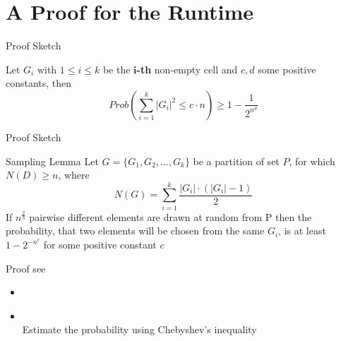 \documentclass[18pt]{beamer}
\begin{document}
\section{A Proof for the Runtime}
\begin{frame}{Proof Sketch}
	\begin{theorem}
		Let $G_i$ with $1\leq i \leq k$ be the \textbf{$\boldsymbol{i}$-th} non-empty cell and $c, d$ some positive constants, then 
	$$Prob\left(\sum_{i=1}^k |G_i|^2 \leq c \cdot n \right) \geq  1 - \frac{1}{2^{n^d}}$$
	\end{theorem}
\end{frame}


\begin{frame}{Proof Sketch}
\begin{block}{Sampling Lemma}
Let $G = \{G_1, G_2,...,G_k\}$ be a partition of set $P$, for which $N(D) \geq n$, where
$$N(G) = \sum_{i=1}^k \frac{|G_i|\cdot (|G_i| - 1)}{2}$$ 
If $n^{\frac{2}{3}}$ pairwise different elements are drawn at random from P then the probability, that two elements will be chosen from the same $G_i$, is at least $1 - 2^{-n^c}$ for some positive constant $c$
\end{block}
Proof see
\begin{itemize}

\item \textbf{\cite{major}}
\item \textbf{\cite{dietzfelbinger1997reliable}} \\\hspace{2em}Estimate the probability using Chebyshev’s inequality
\end{itemize}

\end{frame}
\end{document}
